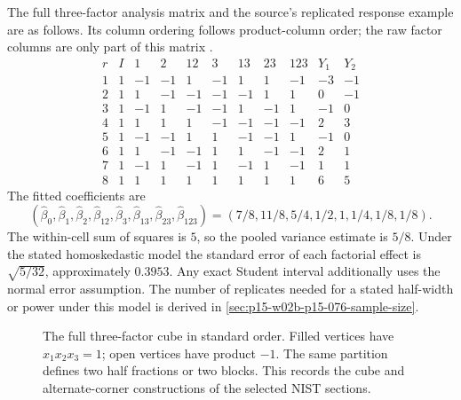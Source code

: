 The full three-factor analysis matrix and the source's replicated response
example are as follows. Its column ordering follows product-column order;
the raw factor columns are only part of this matrix
\cite[Table~3.4]{NISTSEMATECH2012DOE}.
\[
\begin{array}{c|rrrrrrrr|rr}
 r&I&1&2&12&3&13&23&123&Y_1&Y_2\\\hline
1&1&-1&-1&1&-1&1&1&-1&-3&-1\\
2&1&1&-1&-1&-1&-1&1&1&0&-1\\
3&1&-1&1&-1&-1&1&-1&1&-1&0\\
4&1&1&1&1&-1&-1&-1&-1&2&3\\
5&1&-1&-1&1&1&-1&-1&1&-1&0\\
6&1&1&-1&-1&1&1&-1&-1&2&1\\
7&1&-1&1&-1&1&-1&1&-1&1&1\\
8&1&1&1&1&1&1&1&1&6&5
\end{array}
\]
The fitted coefficients are
\[
 (\widehat\beta_0,\widehat\beta_1,\widehat\beta_2,
  \widehat\beta_{12},\widehat\beta_3,\widehat\beta_{13},
  \widehat\beta_{23},\widehat\beta_{123})
 =(7/8,11/8,5/4,1/2,1,1/4,1/8,1/8).
\]
The within-cell sum of squares is \(5\), so the pooled variance estimate
is \(5/8\). Under the stated homoskedastic model the standard error of
each factorial effect is \(\sqrt{5/32}\), approximately \(0.3953\).
Any exact Student interval additionally uses the normal error assumption.
The number of replicates needed for a stated half-width or power under
this model is derived in \cref{sec:p15-w02b-p15-076-sample-size}.

\begin{figure}[htbp]
\centering
{}
\caption{The full three-factor cube in standard order. Filled vertices have
\(x_1x_2x_3=1\); open vertices have product \(-1\). The same partition
defines two half fractions or two blocks. This records the cube and
alternate-corner constructions of the selected NIST sections.}
\label{fig:p15-factorial-cube}
\end{figure}

